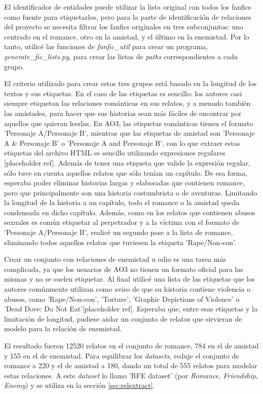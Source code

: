 \documentclass{pre-tfg}
\newcommand{\refToFilterCode}{[placeholder ref]}
\begin{document}
El identificador de entidades puede utilizar la lista original con todos los fanfics como fuente para etiquetarlos, pero para la parte de identificación de relaciones del proyecto se necesita filtrar los fanfics originales en tres subconjuntos: uno centrado en el romance, otro en la amistad, y el último en la enemistad. Por lo tanto, utilicé las funciones de \textit{fanfic\_util} para crear un programa, \textit{generate\_fic\_lists.py}, para crear las listas de \textit{paths} correspondientes a cada grupo.

El criterio utilizado para crear estos tres grupos está basado en la longitud de los textos y sus etiquetas. En el caso de las etiquetas es sencillo: los autores casi siempre etiquetan las relaciones románticas en sus relatos, y a menudo también las amistades, para hacer que sus historias sean más fáciles de encontrar por aquellos que quieran leerlas. En AO3, las etiquetas románticas tienen el formato 'Personaje A/Personaje B', mientras que las etiquetas de amistad son 'Personaje A \& Personaje B' o 'Personaje A and  Personaje B', con lo que extraer estas etiquetas del archivo HTML es sencillo utilizando expresiones regulares \refToFilterCode. Además de tener una etiqueta que valide la expresión regular, sólo tuve en cuenta aquellos relatos que sólo tenían un capítulo. De esa forma, esperaba poder eliminar historias largas y elaboradas que contienen romance, pero que principalmente son una historia costumbrista o de aventuras. Limitando la longitud de la historia a un capítulo, todo el romance o la amistad queda condensada en dicho capítulo. Además, como en los relatos que contienen abusos sexuales es común etiquetar al perpetrador y a la víctima con el formato de 'Personaje A/Personaje B', realicé un segundo pase a la lista de romance, eliminando todos aquellos relatos que tuviesen la etiqueta 'Rape/Non-con'.

Crear un conjunto con relaciones de enemistad u odio es una tarea más complicada, ya que los usuarios de AO3 no tienen un formato oficial para las mismas y no se suelen etiquetar. Al final utilicé una lista de las etiquetas que los autores comúnmente utilizan como aviso de que su historia contiene violencia o abusos, como 'Rape/Non-con', 'Torture', 'Graphic Depictions of Violence' o 'Dead Dove: Do Not Eat'\refToFilterCode . Esperaba que, entre esas etiquetas y la limitación de longitud, pudiese aislar un conjunto de relatos que sirvieran de modelo para la relación de enemistad.

El resultado fueron 12520 relatos en el conjunto de romance, 784 en el de amistad y 155 en el de enemistad. Para equilibrar los \textit{datasets}, reduje el conjunto de romance a 220 y el de amistad a 180, dando un total de 555 relatos para modelar estas relaciones. A este \textit{dataset} lo llamo 'RFE dataset' (por \textit{Romance, Friendship, Enemy}) y se utiliza en la sección \ref{sec:relextract}.
\end{document}
